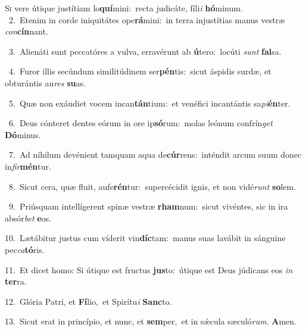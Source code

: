 \lettrine{\initial\textcolor{\initialcolor}{S}}{i} vere útique justítiam lo\-\textbf{quí}\-mini:~\star recta judicáte, fíli\textit{i} \textbf{hó}\-minum.\\
{\numbfont\textcolor{\numbcolor}{~2.}}~Etenim in corde iniquitátes ope\-\textbf{rá}\-mini:~\star in terra injustítias manus vestræ \textit{con}\-\textbf{cín}nant.\par
{\numbfont\textcolor{\numbcolor}{~3.}}~Alienáti sunt peccatóres a vulva, erravérunt ab \textbf{ú}\-tero:~\star locúti \textit{sunt} \textbf{fal}\-sa.\par
{\numbfont\textcolor{\numbcolor}{~4.}}~Furor illis secúndum similitúdinem ser\-\textbf{pén}\-tis:~\star sicut áspidis surdæ, et obturántis au\textit{res} \textbf{su}\-as.\par
{\numbfont\textcolor{\numbcolor}{~5.}}~Quæ non exáudiet vocem incan\-\textbf{tán}\-tium:~\star et venéfici incantántis sa\-\textit{pi}\-\textbf{én}ter.\par
{\numbfont\textcolor{\numbcolor}{~6.}}~Deus cónteret dentes eórum in ore ip\-\textbf{só}\-rum:~\star molas leónum confrín\textit{get} \textbf{Dó}\-minus.\par
{\numbfont\textcolor{\numbcolor}{~7.}}~Ad níhilum devénient tamquam aqua de\-\textbf{cúr}\-rens:~\star inténdit arcum suum donec in\-\textit{fir}\-\textbf{mén}tur.\par
{\numbfont\textcolor{\numbcolor}{~8.}}~Sicut cera, quæ fluit, aufe\-\textbf{rén}\-tur:~\star supercécidit ignis, et non vidé\textit{runt} \textbf{so}\-lem.\par
{\numbfont\textcolor{\numbcolor}{~9.}}~Priúsquam intellígerent spinæ vestræ \textbf{rham}\-num:~\star sicut vivéntes, sic in ira absór\textit{bet} \textbf{e}\-os.\par
{\numbfont\textcolor{\numbcolor}{10.}}~Lætábitur justus cum víderit vin\-\textbf{díc}\-tam:~\star manus suas lavábit in sánguine pec\-\textit{ca}\-\textbf{tó}ris.\par
{\numbfont\textcolor{\numbcolor}{11.}}~Et dicet homo: Si útique est fructus \textbf{jus}\-to:~\star útique est Deus júdicans eos \textit{in} \textbf{ter}\-ra.\par
{\numbfont\textcolor{\numbcolor}{12.}}~Glória Patri, et \textbf{Fí}\-lio,~\star et Spirítu\textit{i} \textbf{Sanc}\-to.\par
{\numbfont\textcolor{\numbcolor}{13.}}~Sicut erat in princípio, et nunc, et \textbf{sem}\-per,~\star et in sǽcula sæculó\-\textit{rum}\-. \textbf{A}\-men.\par
